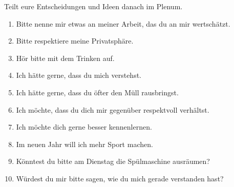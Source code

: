 Teilt eure Entscheidungen und Ideen danach im Plenum.


\begin{enumerate}
  \item Bitte nenne mir etwas an meiner Arbeit, das du an mir wertschätzt.
  \item Bitte respektiere meine Privatsphäre.
  \item Hör bitte mit dem Trinken auf.
  \item Ich hätte gerne, dass du mich verstehst.
  \item Ich hätte gerne, dass du öfter den Müll rausbringst.
  \item Ich möchte, dass du dich mir gegenüber respektvoll verhältst.
  \item Ich möchte dich gerne besser kennenlernen.
  \item Im neuen Jahr will ich mehr Sport machen.
  \item Könntest du bitte am Dienstag die Spülmaschine ausräumen?
  \item Würdest du mir bitte sagen, wie du mich gerade verstanden hast?
\end{enumerate}
